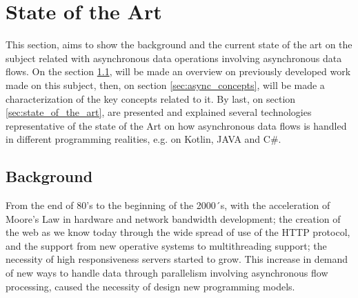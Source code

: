 % 
%  
%
\chapter{State of the Art}
\label{cha:users_manual}

This section, aims to show the background and the current state of the art on the subject related with asynchronous data operations involving asynchronous data flows.  
On the section \ref{sec:related_work}, will be made an overview on previously developed work made on this subject, then, on section \ref{sec:async_concepts}, will be made a characterization of the key concepts related to it. By last, on section \ref{sec:state_of_the_art}, are presented and explained several technologies representative of the state of the Art on how asynchronous data flows is handled in different programming realities, e.g. on Kotlin, JAVA and C\#. 


\section{Background} %
\label{sec:related_work}


From the end of 80’s to the beginning of the 2000´s, with the acceleration of Moore's Law in hardware and network bandwidth development; the creation of the web as we know today through the wide spread of use of the HTTP protocol, and the support from new operative systems to multithreading support; the necessity of high responsiveness servers started to grow. This increase in demand of new ways to handle data through parallelism involving asynchronous flow processing, caused the necessity of design new programming models. 

